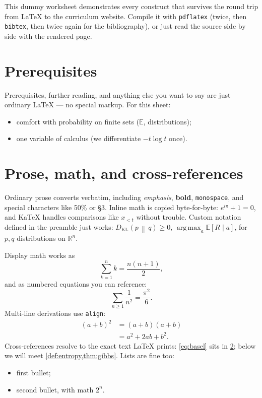 \documentclass[11pt]{article}
\newcommand{\R}{\mathbb{R}}
\newcommand{\E}{\mathbb{E}}
\newcommand{\KL}[2]{D_{\mathrm{KL}}\!\left(#1 \,\middle\|\, #2\right)}
\DeclareMathOperator*{\argmax}{arg\,max}
\begin{document}
This dummy worksheet demonstrates every construct that survives the round trip
from \LaTeX{} to the curriculum website. Compile it with \texttt{pdflatex}
(twice, then \texttt{bibtex}, then twice again for the bibliography), or just
read the source side by side with the rendered page.

\section{Prerequisites}
\label{sec:prereqs}

Prerequisites, further reading, and anything else you want to say are just
ordinary \LaTeX{} — no special markup. For this sheet:
\begin{itemize}
  \item comfort with probability on finite sets ($\E$, distributions);
  \item one variable of calculus (we differentiate $-t \log t$ once).
\end{itemize}

\section{Prose, math, and cross-references}
\label{sec:basics}

Ordinary prose converts verbatim, including \emph{emphasis}, \textbf{bold},
\texttt{monospace}, and special characters like 50\% or \S3. Inline math is
copied byte-for-byte: $e^{i\pi} + 1 = 0$, and KaTeX handles comparisons like
$x_{<t}$ without trouble. Custom notation defined in the preamble just works:
$\KL{p}{q} \geq 0$, $\argmax_{a} \E[R \mid a]$, for $p, q$ distributions on
$\R^n$.

Display math works as \, \[ \sum_{k=1}^{n} k = \frac{n(n+1)}{2}, \]
and as numbered equations you can reference:
\begin{equation}
  \label{eq:basel}
  \sum_{n \geq 1} \frac{1}{n^2} = \frac{\pi^2}{6}.
\end{equation}
Multi-line derivations use \texttt{align}:
\begin{align}
  (a+b)^2 &= (a+b)(a+b) \\
          &= a^2 + 2ab + b^2.
\end{align}
Cross-references resolve to the exact text LaTeX prints: \cref{eq:basel} sits
in \cref{sec:basics}; below we will meet \cref{def:entropy,thm:gibbs}. Lists
are fine too:
\begin{itemize}
  \item first bullet;
  \item second bullet, with math $2^n$.
\end{itemize}
\end{document}
